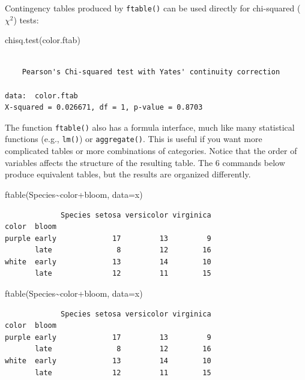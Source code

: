 \documentclass[
  13,
  letterpaper,
]{report}
\newenvironment{Shaded}{\begin{snugshade}}{\end{snugshade}}
\newcommand{\AttributeTok}[1]{\textcolor[rgb]{0.40,0.45,0.13}{#1}}
\newcommand{\FunctionTok}[1]{\textcolor[rgb]{0.28,0.35,0.67}{#1}}
\newcommand{\NormalTok}[1]{\textcolor[rgb]{0.00,0.23,0.31}{#1}}
\newcommand{\SpecialCharTok}[1]{\textcolor[rgb]{0.37,0.37,0.37}{#1}}
\begin{document}
Contingency tables produced by \texttt{ftable()} can be used directly
for chi-squared (\(\chi^2\)) tests:

\begin{Shaded}
\begin{Highlighting}[]
\FunctionTok{chisq.test}\NormalTok{(color.ftab)}
\end{Highlighting}
\end{Shaded}

\begin{verbatim}

    Pearson's Chi-squared test with Yates' continuity correction

data:  color.ftab
X-squared = 0.026671, df = 1, p-value = 0.8703
\end{verbatim}

The function \texttt{ftable()} also has a formula interface, much like
many statistical functions (e.g., \texttt{lm()}) or
\texttt{aggregate()}. This is useful if you want more complicated tables
or more combinations of categories. Notice that the order of variables
affects the structure of the resulting table. The 6 commands below
produce equivalent tables, but the results are organized differently.

\begin{Shaded}
\begin{Highlighting}[]
\FunctionTok{ftable}\NormalTok{(Species}\SpecialCharTok{\textasciitilde{}}\NormalTok{color}\SpecialCharTok{+}\NormalTok{bloom, }\AttributeTok{data=}\NormalTok{x)}
\end{Highlighting}
\end{Shaded}

\begin{verbatim}
             Species setosa versicolor virginica
color  bloom                                    
purple early             17         13         9
       late               8         12        16
white  early             13         14        10
       late              12         11        15
\end{verbatim}

\begin{Shaded}
\begin{Highlighting}[]
\FunctionTok{ftable}\NormalTok{(Species}\SpecialCharTok{\textasciitilde{}}\NormalTok{color}\SpecialCharTok{+}\NormalTok{bloom, }\AttributeTok{data=}\NormalTok{x)}
\end{Highlighting}
\end{Shaded}

\begin{verbatim}
             Species setosa versicolor virginica
color  bloom                                    
purple early             17         13         9
       late               8         12        16
white  early             13         14        10
       late              12         11        15
\end{verbatim}
\end{document}
